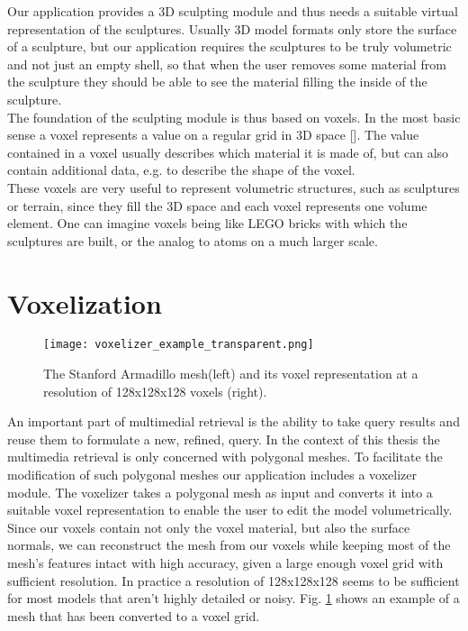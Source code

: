 Our application provides a 3D sculpting module and thus needs a suitable virtual representation of the sculptures. Usually 3D model formats only store the surface of a sculpture, but our application requires the sculptures to be
truly volumetric and not just an empty shell, so that when the user removes some material from the sculpture they should be able to see the material filling the inside of the sculpture.\\
The foundation of the sculpting module is thus based on voxels. In the most basic sense a voxel represents a value on a regular grid in 3D space [].
The value contained in a voxel usually describes which material it is made of, but can also contain additional data, e.g. to describe the shape of the voxel.\\
These voxels are very useful to represent volumetric structures, such as sculptures or terrain, since they fill the 3D space and each voxel represents one volume element. One can imagine voxels being like LEGO bricks with which
the sculptures are built, or the analog to atoms on a much larger scale.

\section{Voxelization}

\hfill

\begin{figure}
\centering
\captionsetup{width=0.8\textwidth}
\texttt{[image: voxelizer\_example\_transparent.png]}
\caption{The Stanford Armadillo mesh\protect\footnotemark  (left) and its voxel representation at a resolution of 128x128x128 voxels (right).}
\label{fig:voxelizer_example}
\end{figure}

An important part of multimedial retrieval is the ability to take query results and reuse them to formulate a new, refined, query. In the context of this thesis the multimedia retrieval
is only concerned with polygonal meshes. To facilitate the modification of such polygonal meshes our application includes a voxelizer module. The voxelizer takes a polygonal
mesh as input and converts it into a suitable voxel representation to enable the user to edit the model volumetrically. Since
our voxels contain not only the voxel material, but also the surface normals, we can reconstruct the mesh from our voxels while keeping most of the mesh's features intact with high accuracy, given
a large enough voxel grid with sufficient resolution. In practice a resolution of 128x128x128 seems to be sufficient for most models that aren't highly detailed or noisy.
Fig. \ref{fig:voxelizer_example} shows an example of a mesh that has been converted to a voxel grid.

